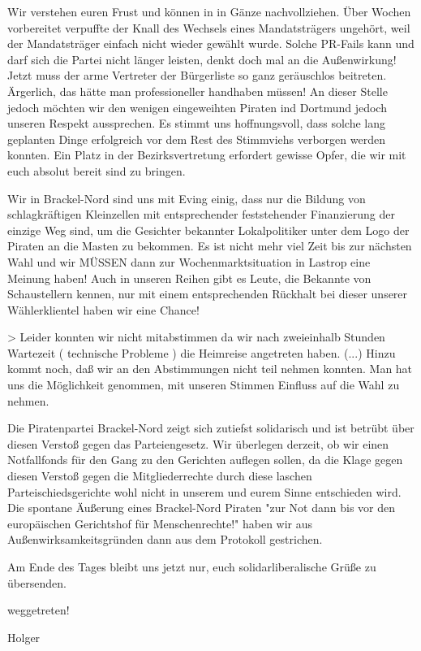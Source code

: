 \documentclass[a1paper]{article}
\begin{document}
\begin{multicols}{7}
{Wir verstehen euren Frust und können in in Gänze nachvollziehen. Über Wochen vorbereitet verpuffte der Knall des Wechsels eines Mandatsträgers ungehört, weil der Mandatsträger einfach nicht wieder gewählt wurde. Solche PR-Fails kann und darf sich die Partei nicht länger leisten, denkt doch mal an die Außenwirkung! Jetzt muss der arme Vertreter der Bürgerliste so ganz geräuschlos beitreten. Ärgerlich, das hätte man professioneller handhaben müssen! An dieser Stelle jedoch möchten wir den wenigen eingeweihten Piraten ind Dortmund jedoch unseren Respekt aussprechen. Es stimmt uns hoffnungsvoll, dass solche lang geplanten Dinge erfolgreich vor dem Rest des Stimmviehs verborgen werden konnten. Ein Platz in der Bezirksvertretung erfordert gewisse Opfer, die wir mit euch absolut bereit sind zu bringen.

Wir in Brackel-Nord sind uns mit Eving einig, dass nur die Bildung von schlagkräftigen Kleinzellen mit entsprechender feststehender Finanzierung der einzige Weg sind, um die Gesichter bekannter Lokalpolitiker unter dem Logo der Piraten an die Masten zu bekommen. Es ist nicht mehr viel Zeit bis zur nächsten Wahl und wir MÜSSEN dann zur Wochenmarktsituation in Lastrop eine Meinung haben! Auch in unseren Reihen gibt es Leute, die Bekannte von Schaustellern kennen, nur mit einem entsprechenden Rückhalt bei dieser unserer Wählerklientel haben wir eine Chance!


> Leider konnten wir nicht mitabstimmen da wir nach zweieinhalb Stunden Wartezeit ( technische Probleme ) die Heimreise angetreten haben. (...) Hinzu kommt noch, daß wir an den Abstimmungen nicht teil nehmen konnten. Man hat uns  die Möglichkeit genommen, mit unseren Stimmen Einfluss auf die Wahl zu nehmen.


Die Piratenpartei Brackel-Nord zeigt sich zutiefst solidarisch und ist betrübt über diesen Verstoß gegen das Parteiengesetz. Wir überlegen derzeit, ob wir einen Notfallfonds für den Gang zu den Gerichten auflegen sollen, da die Klage gegen diesen Verstoß gegen die Mitgliederrechte durch diese laschen Parteischiedsgerichte wohl nicht in unserem und eurem Sinne entschieden wird. Die spontane Äußerung eines Brackel-Nord Piraten "zur Not dann bis vor den europäischen Gerichtshof für Menschenrechte!" haben wir aus Außenwirksamkeitsgründen dann aus dem Protokoll gestrichen.

Am Ende des Tages bleibt uns jetzt nur, euch solidarliberalische Grüße zu übersenden.

weggetreten!

Holger

}
\end{multicols}
\end{document}
